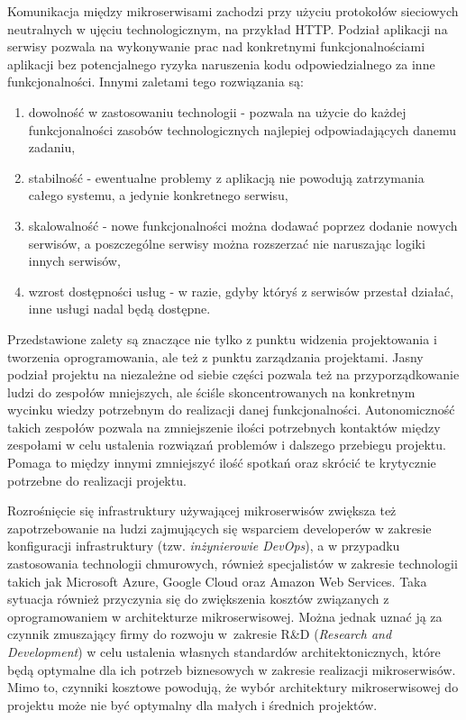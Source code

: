 \documentclass{SGGW-thesis}
\begin{document}
Komunikacja między mikroserwisami zachodzi przy użyciu protokołów sieciowych neutralnych w ujęciu technologicznym, na przykład HTTP. Podział aplikacji na serwisy pozwala na wykonywanie prac nad konkretnymi funkcjonalnościami aplikacji bez potencjalnego ryzyka naruszenia kodu odpowiedzialnego za inne funkcjonalności. Innymi zaletami tego rozwiązania są:

\begin{enumerate}
	\item dowolność w zastosowaniu technologii - pozwala na użycie do każdej funkcjonalności zasobów technologicznych najlepiej odpowiadających danemu zadaniu,
	\item stabilność - ewentualne problemy z aplikacją nie powodują zatrzymania całego systemu, a jedynie konkretnego serwisu,
	\item skalowalność - nowe funkcjonalności można dodawać poprzez dodanie nowych serwisów, a poszczególne serwisy można rozszerzać nie naruszając logiki innych serwisów,
	\item wzrost dostępności usług - w razie, gdyby któryś z serwisów przestał działać, inne usługi nadal będą dostępne.
\end{enumerate}

Przedstawione zalety są znaczące nie tylko z punktu widzenia projektowania i tworzenia oprogramowania, ale też z punktu zarządzania projektami. Jasny podział projektu na niezależne od siebie części pozwala też na przyporządkowanie ludzi do zespołów mniejszych, ale ściśle skoncentrowanych na konkretnym wycinku wiedzy potrzebnym do realizacji danej funkcjonalności.
Autonomiczność takich zespołów pozwala na zmniejszenie ilości potrzebnych kontaktów między zespołami w celu ustalenia rozwiązań problemów i dalszego przebiegu projektu. Pomaga to między innymi zmniejszyć ilość spotkań oraz skrócić te krytycznie potrzebne do realizacji projektu.

Rozrośnięcie się infrastruktury używającej mikroserwisów zwiększa też zapotrzebowanie na ludzi zajmujących się wsparciem developerów w zakresie konfiguracji infrastruktury (tzw. \textit{inżynierowie DevOps}), a w przypadku zastosowania technologii chmurowych, również specjalistów w zakresie technologii takich jak Microsoft Azure, Google Cloud oraz Amazon Web Services. Taka sytuacja również przyczynia się do zwiększenia kosztów związanych z oprogramowaniem w architekturze mikroserwisowej. Można jednak uznać ją za czynnik zmuszający firmy do rozwoju w~zakresie R\&D (\textit{Research and Development}) w celu ustalenia własnych standardów architektonicznych, które będą optymalne dla ich potrzeb biznesowych w zakresie realizacji mikroserwisów. Mimo to, czynniki kosztowe powodują, że wybór architektury mikroserwisowej do projektu może nie być optymalny dla małych i średnich projektów.
\end{document}
